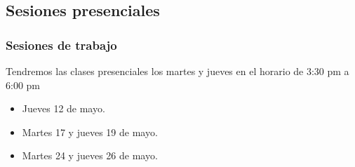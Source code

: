 \documentclass[12pt]{beamer}
\begin{document}
\subsection{Sesiones presenciales}

\begin{frame}
\frametitle{Sesiones de trabajo}
Tendremos las clases presenciales los martes y jueves en el horario de 3:30 pm a 6:00 pm
\begin{itemize}[<+->]
\item Jueves 12 de mayo.
\item Martes 17 y jueves 19 de mayo.
\item Martes 24 y jueves 26 de mayo.
\end{itemize}
\end{frame}
\end{document}
